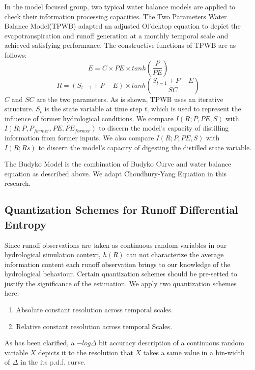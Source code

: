 \documentclass[draft,wrr]{AGUTeX}
\begin{document}
\begin{article}
In the model focused group, two typical water balance models are applied to check their information processing capacities. The Two Parameters Water Balance Model(TPWB)\citep{xiong1999two} adapted an adjusted Ol'dektop equation\citep{jobson1982evaporation} to depict the evapotranspiration and runoff generation at a monthly temporal scale and achieved satisfying performance. The constructive functions of TPWB are as follows:
 \begin{equation}
E=C\times PE \times tanh(\frac{P}{PE})
 \end{equation}
 \begin{equation}
R=(S_{t-1}+P-E)\times tanh(\frac{S_{t-1}+P-E}{SC})
 \end{equation}
$C$ and $SC$ are the two parameters. As is shown, TPWB uses an iterative structure. $S_t$ is the state variable at time step $t$, which is used to  represent the influence of former hydrological conditions. We compare $I(R;P,PE,S)$ with $I(R;P,P_{former},PE,PE_{former})$ to discern the model's capacity of distilling information from former inputs. We also compare $I(R;P,PE,S)$ with $I(R;Rs)$ to discern the model's capacity of digesting the distilled state variable.

 The Budyko Model is the combination of Budyko Curve and water balance equation as described above. We adapt Choudhury-Yang Equation in this research.  

\subsection{Quantization Schemes for Runoff Differential Entropy}

Since runoff observations are taken as continuous random variables in our hydrological simulation context, $h(R)$ can not characterize the average information content each runoff observation brings to our knowledge of the hydrological behaviour. Certain quantization schemes should be pre-setted to justify the significance of the estimation. We apply two quantization schemes here:
\begin{enumerate}
\item Absolute constant resolution across temporal scales.
\item Relative constant resolution across temporal Scales.
\end{enumerate} 

As has been clarified, a $-log\Delta$ bit accuracy description of a continuous random variable $X$ depicts it to the resolution that $X$ takes a same value in a bin-width of $\Delta$ in the its p.d.f. curve. 


\end{article}
\end{document}
